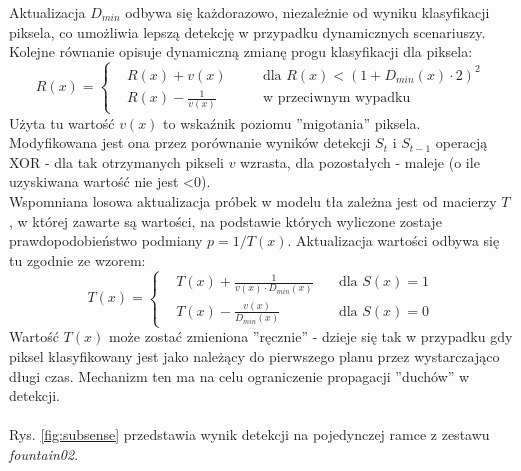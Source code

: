 Aktualizacja $D_{min}$ odbywa się każdorazowo, niezależnie od wyniku klasyfikacji piksela, co umożliwia lepszą detekcję w przypadku dynamicznych scenariuszy.\\
Kolejne równanie opisuje dynamiczną zmianę progu klasyfikacji dla piksela:
\begin{equation}
R(x) = \left\{
\begin{split}
&R(x) + v(x) & \quad &\text{dla $R(x)<(1+D_{min}(x)\cdot 2)^2$} \\
&R(x) - \frac{1}{v(x)} & \quad &\text{w przeciwnym wypadku}
\end{split}
\right.
\end{equation}
Użyta tu wartość $v(x)$ to wskaźnik poziomu ''migotania'' piksela. Modyfikowana jest ona przez porównanie wyników detekcji $S_{t}$ i $S_{t-1}$ operacją XOR - dla tak otrzymanych pikseli $v$ wzrasta, dla pozostałych - maleje (o ile uzyskiwana wartość nie jest <0). \\
Wspomniana losowa aktualizacja próbek w modelu tła zależna jest od macierzy $T$, w której zawarte są wartości, na podstawie których wyliczone zostaje prawdopodobieństwo podmiany $p = 1/T(x)$. Aktualizacja wartości odbywa się tu zgodnie ze wzorem:
\begin{equation}
T(x) = \left\{
\begin{split}
&T(x) + \frac{1}{v(x)\cdot D_{min}(x)} & \quad \text{dla $S(x)=1$} \\
&T(x) - \frac{v(x)}{D_{min}(x)} & \quad \text{dla $S(x)=0$}
\end{split}
\right.
\end{equation}
Wartość $T(x)$ może zostać zmieniona ''ręcznie'' - dzieje się tak w przypadku gdy piksel klasyfikowany jest jako należący do pierwszego planu przez wystarczająco długi czas. Mechanizm ten ma na celu ograniczenie propagacji ''duchów'' w detekcji.
\\ \\
Rys. \ref{fig:subsense} przedstawia wynik detekcji na pojedynczej ramce z zestawu \textit{fountain02}.

